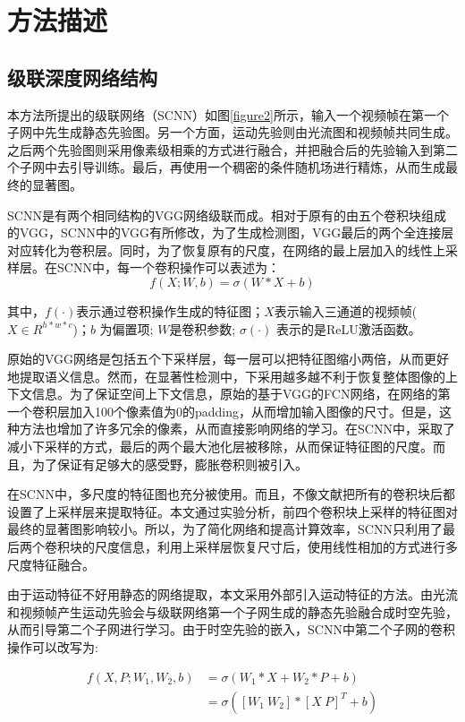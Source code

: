 \section{方法描述}
\subsection{级联深度网络结构}
本方法所提出的级联网络（SCNN）如图\ref{figure2}所示，输入一个视频帧在第一个子网中先生成静态先验图。另一个方面，运动先验则由光流图和视频帧共同生成。之后两个先验图则采用像素级相乘的方式进行融合，并把融合后的先验输入到第二个子网中去引导训练。最后，再使用一个稠密的条件随机场进行精炼，从而生成最终的显著图。

SCNN是有两个相同结构的VGG网络级联而成。相对于原有的由五个卷积块组成的VGG，SCNN中的VGG有所修改，为了生成检测图，VGG最后的两个全连接层对应转化为卷积层。同时，为了恢复原有的尺度，在网络的最上层加入的线性上采样层。在SCNN中，每一个卷积操作可以表述为：
\begin{equation}
 \label{eq1}
   f(X; W,b) = \sigma (W * X + b)
\end{equation}

其中，$f(\cdot)$表示通过卷积操作生成的特征图；$X$表示输入三通道的视频帧($X \in R^{h*w*c}$)；$b$ 为偏置项; $W$是卷积参数; $\sigma(\cdot)$ 表示的是ReLU激活函数。

原始的VGG网络是包括五个下采样层，每一层可以把特征图缩小两倍，从而更好地提取语义信息。然而，在显著性检测中，下采用越多越不利于恢复整体图像的上下文信息。为了保证空间上下文信息，原始的基于VGG的FCN网络\cite{simonyan2014very}，在网络的第一个卷积层加入100个像素值为0的padding，从而增加输入图像的尺寸。但是，这种方法也增加了许多冗余的像素，从而直接影响网络的学习。在SCNN中，采取了减小下采样的方式，最后的两个最大池化层被移除，从而保证特征图的尺度。而且，为了保证有足够大的感受野，膨胀卷积\cite{chen2014semantic}则被引入。

在SCNN中，多尺度的特征图也充分被使用。而且，不像文献\cite{li2016deep}把所有的卷积块后都设置了上采样层来提取特征。本文通过实验分析，前四个卷积块上采样的特征图对最终的显著图影响较小。所以，为了简化网络和提高计算效率，SCNN只利用了最后两个卷积块的尺度信息，利用上采样层恢复尺寸后，使用线性相加的方式进行多尺度特征融合。

由于运动特征不好用静态的网络提取，本文采用外部引入运动特征的方法。由光流和视频帧产生运动先验会与级联网络第一个子网生成的静态先验融合成时空先验，从而引导第二个子网进行学习。由于时空先验的嵌入，SCNN中第二个子网的卷积操作可以改写为:

\begin{equation}
\label{eq2}
\begin{aligned}
   f(X, P; W_1, W_2,b) &= \sigma (W_1 * X + W_2 * P + b) \\
                        &= \sigma([W_1 \  W_2]*[X \  P]^T  + b)
\end{aligned}
\end{equation}

